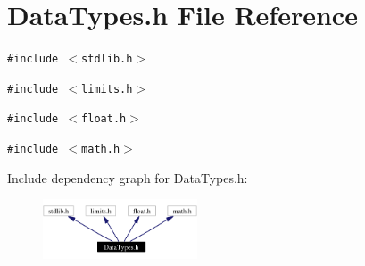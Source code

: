 \section{Data\-Types.h File Reference}
\label{DataTypes_8h}
{\tt \#include $<$stdlib.h$>$}\par
{\tt \#include $<$limits.h$>$}\par
{\tt \#include $<$float.h$>$}\par
{\tt \#include $<$math.h$>$}\par


Include dependency graph for Data\-Types.h:\begin{figure}[H]
\begin{center}
\leavevmode
\includegraphics[width=130pt]{DataTypes_8h__incl}
\end{center}
\end{figure}


